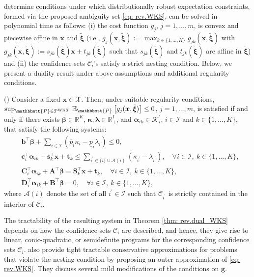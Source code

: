 \documentclass[final,onefignum,onetabnum]{class}
\newcommand{\ee}[2]{\mathbb{E}_{#1} \left[ #2 \right]}
\newcommand{\bs}[1]{\boldsymbol{#1}} %
\newcommand{\Bs}[1]{\mathbb{#1}} %
\newcommand{\Ts}[1]{\mathbbmtt{#1}} %
\newcommand{\Cs}[1]{\mathcal{#1}} %
\newcommand{\txi}{\tilde{\bs{\xi}}}
\newcommand{\ul}[1]{\underline{#1}}
\newcommand{\ol}[1]{\overline{#1}}
\newcommand{\dual}[1]{\Cs{#1}^{\prime}}
\begin{document}
\citet{wiesemann2014} determine conditions under which distributionally robust  expectation constraints, formed via the proposed ambiguity
set \eqref{eq: rev.WKS}, can be solved in polynomial time %
as follows: (i) the cost function $g_{j}$, $j=1, \ldots, m$, is convex and piecewise affine in  $\bs{x}$
and $\bs{\txi}$ (i.e., $g_{j}(\bs{x},\txi):=\max_{k \in \{1,\ldots, K\}} g_{jk}(\bs{x},\txi)$ with $g_{jk}(\bs{x},\txi):=s_{jk}(\txi)\bs{x}+t_{jk}(\txi)$ such that $s_{jk}(\txi)$ and $t_{jk}(\txi)$ are affine in $\txi$) and (ii) the confidence sets $\Cs{C}_{i}$'s satisfy a strict nesting
condition. Below, we present a duality result under above assumptions and additional regularity conditions. 
\begin{theorem}{(\citet[Theorem~1]{wiesemann2014})}
    \label{thm: rev.dual_WKS}
    Consider  a fixed $\bs{x} \in \Cs{X}$. Then, under suitable regularity conditions, $\sup_{\Ts{P} \in \Cs{P}^{\text{WKS}}} \ \ee{\Ts{P}}{g_{j}(\bs{x},\txi)} \le 0$, $j=1, \ldots, m$, is satisfied if and only if there exists $\bs{\beta} \in \Bs{R}^{K}$, $\bs{\kappa}, \bs{\lambda} \in \Bs{R}_{+}^{I}$, and $\bs{\alpha}_{ik} \in \dual{K}_{i}$, $i \in \Cs{I}$ and $k \in \{1, \ldots, K\}$, that satisfy the following systems:
    \begin{align*}
       & \bs{b}^{\top}\bs{\beta} + \sum_{i \in \Cs{I}} (\ol{p}_{i} \kappa_{i}- \ul{p}_{i} \lambda_{i}) \le 0, \\
       & \bs{c}_{i}^{\top}\bs{\alpha}_{ik}+ \bs{s}_{k}^{\top}\bs{x} + \bs{t}_{k} \le \sum_{i^{\prime} \in \{i\} \cup \Cs{A}(i)} (\kappa_{i^{\prime}}-\lambda_{i^{\prime}}), \quad \forall i \in \Cs{I}, \ k \in \{1, \ldots, K\},\\
       & \bs{C}_{i}^{\top} \bs{\alpha}_{ik} + \bs{A}^{\top}\bs{\beta}= \bs{S}^{\top}_{k} \bs{x} + \bs{t}_{k}, \quad \forall i \in \Cs{I}, \ k \in \{1, \ldots, K\},\\
       &\bs{D}_{i}^{\top} \bs{\alpha}_{ik} + \bs{B}^{\top}\bs{\beta}=0, \quad \forall i \in \Cs{I}, \ k \in \{1, \ldots, K\},
    \end{align*}
    where $\Cs{A}(i)$ denote the set of all $i^{\prime} \in \Cs{I}$ such that $\Cs{C}_{i^{\prime}}$ is strictly contained in the interior of  $\Cs{C}_{i}$. 
\end{theorem}


The tractability of the resulting system in Theorem \ref{thm: rev.dual_WKS} depends on how the confidence sets $\Cs{C}_{i}$ are described, and hence, they give rise to linear, conic-quadratic, or semidefinite programs for the corresponding confidence sets $\Cs{C}_{i}$.  \citet{wiesemann2014} also provide tight tractable conservative approximations for problems that violate the nesting condition by proposing an outer approximation of \eqref{eq: rev.WKS}.
They  discuss several mild modifications of the conditions on $\bs{g}$.
\end{document}

